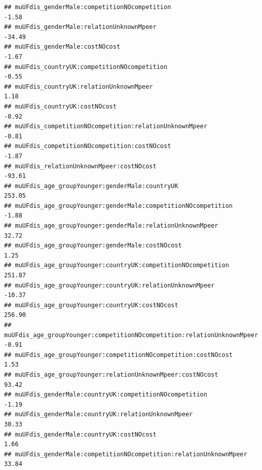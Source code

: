 \documentclass[
]{article}
\begin{document}
\begin{verbatim}
## muUFdis_genderMale:competitionNOcompetition                                                               -1.58
## muUFdis_genderMale:relationUnknownMpeer                                                                  -34.49
## muUFdis_genderMale:costNOcost                                                                             -1.67
## muUFdis_countryUK:competitionNOcompetition                                                                -0.55
## muUFdis_countryUK:relationUnknownMpeer                                                                     1.18
## muUFdis_countryUK:costNOcost                                                                              -0.92
## muUFdis_competitionNOcompetition:relationUnknownMpeer                                                     -0.81
## muUFdis_competitionNOcompetition:costNOcost                                                               -1.87
## muUFdis_relationUnknownMpeer:costNOcost                                                                  -93.61
## muUFdis_age_groupYounger:genderMale:countryUK                                                            253.05
## muUFdis_age_groupYounger:genderMale:competitionNOcompetition                                              -1.88
## muUFdis_age_groupYounger:genderMale:relationUnknownMpeer                                                  32.72
## muUFdis_age_groupYounger:genderMale:costNOcost                                                             1.25
## muUFdis_age_groupYounger:countryUK:competitionNOcompetition                                              251.87
## muUFdis_age_groupYounger:countryUK:relationUnknownMpeer                                                  -10.37
## muUFdis_age_groupYounger:countryUK:costNOcost                                                            256.90
## muUFdis_age_groupYounger:competitionNOcompetition:relationUnknownMpeer                                    -0.91
## muUFdis_age_groupYounger:competitionNOcompetition:costNOcost                                               1.53
## muUFdis_age_groupYounger:relationUnknownMpeer:costNOcost                                                  93.42
## muUFdis_genderMale:countryUK:competitionNOcompetition                                                     -1.19
## muUFdis_genderMale:countryUK:relationUnknownMpeer                                                         30.33
## muUFdis_genderMale:countryUK:costNOcost                                                                    1.66
## muUFdis_genderMale:competitionNOcompetition:relationUnknownMpeer                                          33.84

\end{verbatim}
\end{document}
